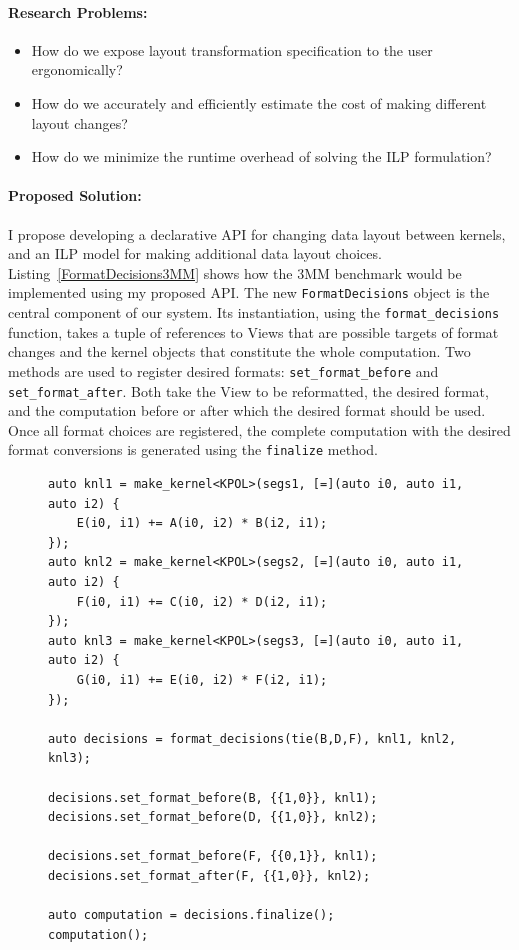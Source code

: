 \documentclass{article}
\begin{document}
\paragraph{Research Problems:}

\begin{itemize}
\item How do we expose layout transformation specification to the user ergonomically?
\item How do we accurately and efficiently estimate the cost of making different layout changes?
\item How do we minimize the runtime overhead of solving the ILP formulation?
\end{itemize}

\paragraph{Proposed Solution:}

I propose developing a declarative API for changing data layout between kernels, and an ILP model for making additional data layout choices.
Listing~\ref{FormatDecisions3MM} shows how the 3MM benchmark would be implemented using my proposed API. 
The new \verb.FormatDecisions. object is the central component of our system. 
Its instantiation, using the \verb.format_decisions. function, takes a tuple of references to Views that are possible targets of format changes and the kernel objects that constitute the whole computation.
Two methods are used to register desired formats: \verb.set_format_before. and \verb.set_format_after..
Both take the View to be reformatted, the desired format, and the computation before or after which the desired format should be used.
Once all format choices are registered, the complete computation with the desired format conversions is generated using the \verb.finalize. method.

\begin{figure}
\begin{lstlisting}[caption={The 3MM benchmark implemented using FormatDecisions.},
    label={FormatDecisions3MM}]
auto knl1 = make_kernel<KPOL>(segs1, [=](auto i0, auto i1, auto i2) {
    E(i0, i1) += A(i0, i2) * B(i2, i1);
});
auto knl2 = make_kernel<KPOL>(segs2, [=](auto i0, auto i1, auto i2) {
    F(i0, i1) += C(i0, i2) * D(i2, i1);
});
auto knl3 = make_kernel<KPOL>(segs3, [=](auto i0, auto i1, auto i2) {
    G(i0, i1) += E(i0, i2) * F(i2, i1);
});

auto decisions = format_decisions(tie(B,D,F), knl1, knl2, knl3);

decisions.set_format_before(B, {{1,0}}, knl1);
decisions.set_format_before(D, {{1,0}}, knl2);

decisions.set_format_before(F, {{0,1}}, knl1);
decisions.set_format_after(F, {{1,0}}, knl2);

auto computation = decisions.finalize();
computation();
\end{lstlisting}
\end{figure}
\end{document}
